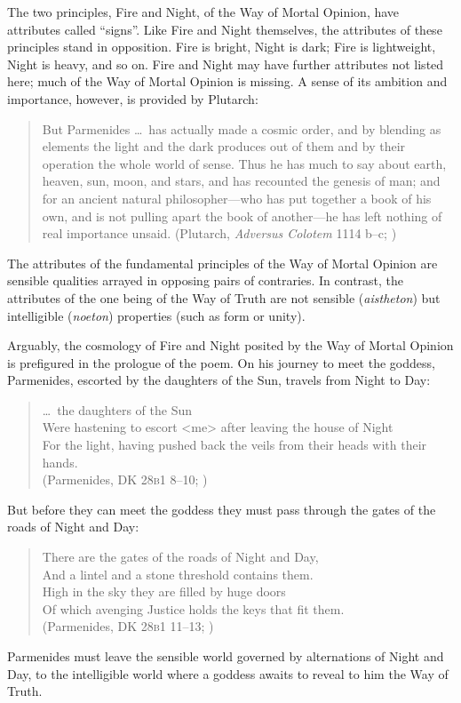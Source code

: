 The two principles, Fire and Night, of the Way of Mortal Opinion, have attributes called ``signs''. Like Fire and Night themselves, the attributes of these principles stand in opposition. Fire is bright, Night is dark; Fire is lightweight, Night is heavy, and so on. Fire and Night may have further attributes not listed here; much of the Way of Mortal Opinion is missing. A sense of its ambition and importance, however, is provided by Plutarch:
\begin{quote}
    But Parmenides \ldots\ has actually made a cosmic order, and by blending as elements the light and the dark produces out of them and by their operation the whole world of sense. Thus he has much to say about earth, heaven, sun, moon, and stars, and has recounted the genesis of man; and for an ancient natural philosopher---who has put together a book of his own, and is not pulling apart the book of another---he has left nothing of real importance unsaid. (Plutarch, \emph{Adversus Colotem} 1114 b--c; \citealt[231]{Einarson:1967zr})
\end{quote}
The attributes of the fundamental principles of the Way of Mortal Opinion are sensible qualities arrayed in opposing pairs of contraries. In contrast, the attributes of the one being of the Way of Truth are not sensible (\emph{aistheton}) but intelligible (\emph{noeton}) properties (such as form or unity). 

Arguably, the cosmology of Fire and Night posited by the Way of Mortal Opinion is prefigured in the prologue of the poem. On his journey to meet the goddess, Parmenides, escorted by the daughters of the Sun, travels from Night to Day:
\begin{verse}
    \ldots\ the daughters of the Sun\\
    Were hastening to escort <me> after leaving the house of Night\\
    For the light, having pushed back the veils from their heads with their hands.\\ 
    (Parmenides, DK 28\textsc{b}1 8--10; \citealt[151]{McKirahan:1994ve})
\end{verse}
But before they can meet the goddess they must pass through the gates of the roads of Night and Day:
\begin{verse}
    There are the gates of the roads of Night and Day,\\
    And a lintel and a stone threshold contains them.\\ 
    High in the sky they are filled by huge doors\\
    Of which avenging Justice holds the keys that fit them.\\
    (Parmenides, DK 28\textsc{b}1 11--13; \citealt[151]{McKirahan:1994ve})
\end{verse}
Parmenides must leave the sensible world governed by alternations of Night and Day, to the intelligible world where a goddess awaits to reveal to him the Way of Truth.

